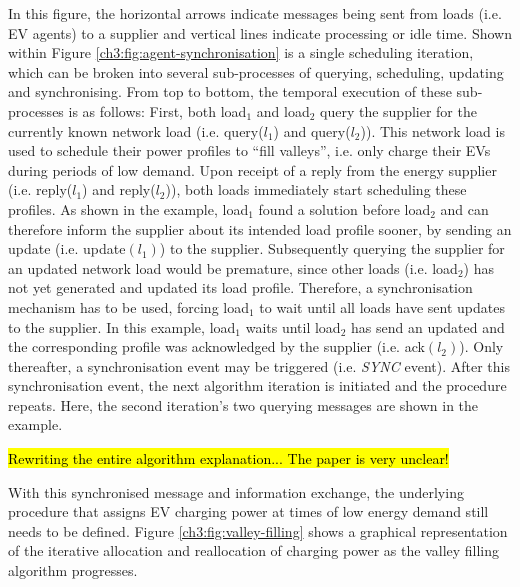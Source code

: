 In this figure, the horizontal arrows indicate messages being sent from loads (i.e. EV agents) to a supplier and vertical lines indicate processing or idle time.
Shown within Figure \ref{ch3:fig:agent-synchronisation} is a single scheduling iteration, which can be broken into several sub-processes of querying, scheduling, updating and synchronising.
From top to bottom, the temporal execution of these sub-processes is as follows:
First, both load$_1$ and load$_2$ query the supplier for the currently known network load (i.e. query($l_1$) and query($l_2$)).
This network load is used to schedule their power profiles to ``fill valleys'', i.e. only charge their EVs during periods of low demand.
Upon receipt of a  reply from the energy supplier (i.e. reply($l_1$) and reply($l_2$)), both loads immediately start scheduling these profiles.
As shown in the example, load$_1$ found a solution before load$_2$ and can therefore inform the supplier about its intended load profile sooner, by sending an update (i.e. update$(l_1)$) to the supplier.
Subsequently querying the supplier for an updated network load would be premature, since other loads (i.e. load$_2$) has not yet generated and updated its load profile.
Therefore, a synchronisation mechanism has to be used, forcing load$_1$ to wait until all loads have sent updates to the supplier.
In this example, load$_1$ waits until load$_2$ has send an updated and the corresponding profile was acknowledged by the supplier (i.e. ack$(l_2)$).
Only thereafter, a synchronisation event may be triggered (i.e. \textit{SYNC} event).
After this synchronisation event, the next algorithm iteration is initiated and the procedure repeats.
Here, the second iteration's two querying messages are shown in the example.


\hl{Rewriting the entire algorithm explanation... The paper is very unclear!}

With this synchronised message and information exchange, the underlying procedure that assigns EV charging power at times of low energy demand still needs to be defined.
Figure \ref{ch3:fig:valley-filling} shows a graphical representation of the iterative allocation and reallocation of charging power as the valley filling algorithm progresses.

